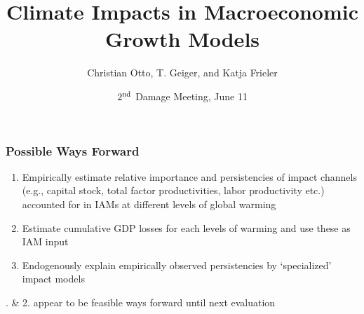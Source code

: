 \documentclass[
c,
11pt,
aspectratio=169, %
final,
]{beamer}
\author{Christian Otto, T. Geiger, and Katja Frieler}
\title{Climate Impacts in Macroeconomic Growth Models}
\date{$2^{\operatorname{nd}}$ Damage Meeting, June 11}
\begin{document}
\begin{frame}[plain]
  \maketitle
\end{frame}
\begin{frame}
  \frametitle{Possible Ways Forward}
  \begin{enumerate}
  \item Empirically estimate relative importance and persistencies of impact channels (e.g., capital stock, total factor productivities, labor productivity etc.) accounted for in IAMs at different levels of global warming
  \item Estimate cumulative GDP losses for each levels of warming and use these as IAM input
  \item Endogenously explain empirically observed persistencies by `specialized' impact models 
  \end{enumerate}
  \begin{itemize}
. \& 2. appear to be feasible ways forward until next evaluation
  \end{itemize}
\end{frame}
\end{document}

